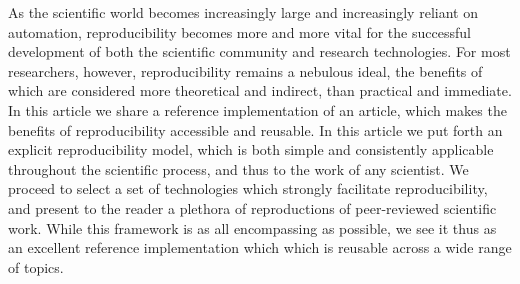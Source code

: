 As the scientific world becomes increasingly large and increasingly reliant on automation, reproducibility becomes more and more vital for the successful development of both the scientific community and research technologies.
For most researchers, however, reproducibility remains a nebulous ideal, the benefits of which are considered more theoretical and indirect, than practical and immediate.
In this article we share a reference implementation of an article, which makes the benefits of reproducibility accessible and reusable.
In this article we put forth an explicit reproducibility model, which is both simple and consistently applicable throughout the scientific process, and thus to the work of any scientist.
We proceed to select a set of technologies which strongly facilitate reproducibility, and present to the reader a plethora of reproductions of peer-reviewed scientific work.
While this framework is as all encompassing as possible, we see it thus as an excellent reference implementation which which is reusable across a wide range of topics.
